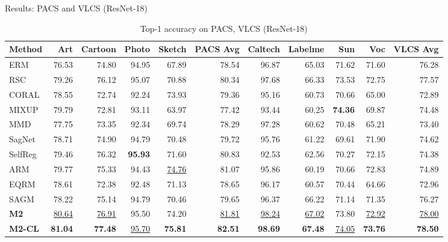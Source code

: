 \documentclass[t, aspectratio=169]{beamer} %
\begin{document}
	\begin{frame}{Results: PACS and VLCS (ResNet-18)}
\begin{table}[htbp]
\centering
\caption{Top-1 accuracy on PACS, VLCS (ResNet-18)}

\tiny
\begin{adjustbox}{max width=\textwidth, max totalheight=0.75\textheight, keepaspectratio}
\begin{tabular}{lrrrrrrrrrr}
\toprule
Method & Art & Cartoon & Photo & Sketch & \textbf{PACS Avg} & Caltech & Labelme & Sun & Voc & \textbf{VLCS Avg} \\
\midrule
ERM & 76.53 & 74.80 & 94.95 & 67.89 & 78.54 & 96.87 & 65.03 & 71.62 & 71.60 & 76.28 \\
RSC & 79.26 & 76.12 & 95.07 & 70.88 & 80.34 & 97.68 & 66.33 & 73.53 & 72.75 & 77.57 \\
CORAL & 78.55 & 72.74 & 92.24 & 73.93 & 79.36 & 95.16 & 60.73 & 70.66 & 65.00 & 72.89 \\
MIXUP & 79.79 & 72.81 & 93.11 & 63.97 & 77.42 & 93.44 & 60.25 & \textbf{74.36} & 69.87 & 74.48 \\
MMD & 77.75 & 73.35 & 92.34 & 69.74 & 78.29 & 97.28 & 60.62 & 70.48 & 65.21 & 73.40 \\
SagNet & 78.71 & 74.90 & 94.79 & 70.48 & 79.72 & 95.76 & 61.22 & 69.61 & 71.90 & 74.62 \\
SelfReg & 79.46 & 76.32 & \textbf{95.93} & 71.60 & 80.83 & 92.53 & 62.56 & 70.27 & 72.15 & 74.38 \\
ARM & 79.77 & 75.33 & 94.43 & \underline{74.76} & 81.07 & 95.86 & 60.19 & 70.66 & 72.83 & 74.89 \\
EQRM & 78.61 & 72.38 & 92.48 & 71.13 & 78.65 & 96.17 & 60.57 & 70.44 & 64.66 & 72.96 \\
SAGM & 78.22 & 75.14 & 94.79 & 70.46 & 79.65 & 96.37 & 66.22 & 71.14 & 71.35 & 76.27 \\
\midrule
\textbf{M2} & \underline{80.64} & \underline{76.91} & 95.50 & 74.20 & \underline{81.81} & \underline{98.24} & \underline{67.02} & 73.80 & \underline{72.92} & \underline{78.00} \\
\textbf{M2-CL} & \textbf{81.04} & \textbf{77.48} & \underline{95.70} & \textbf{75.81} & \textbf{82.51} & \textbf{98.69} & \textbf{67.48} & \underline{74.05} & \textbf{73.76} & \textbf{78.50} \\
\bottomrule
\end{tabular}
\end{adjustbox}
\end{table}
	\end{frame}
\end{document}
